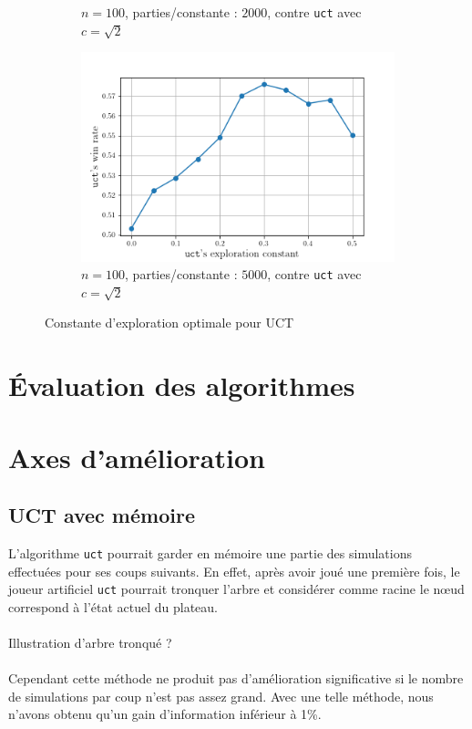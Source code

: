 \documentclass[a4paper]{article}
\theoremstyle{definition}
\begin{document}
\begin{figure}[!h]
\begin{subfigure}{0.32\textwidth}
		\caption{$n=100$, parties/constante : $2000$, contre \texttt{uct} avec $c = \sqrt{2}$}
		\label{fig:2_}
	\end{subfigure}
	\hfill
	\begin{subfigure}{0.32\textwidth}
		\centering
		\includegraphics[width=\textwidth]{test3.png}
		\caption{$n=100$, parties/constante : $5000$, contre \texttt{uct} avec $c = \sqrt{2}$}
		\label{fig:3_}
	\end{subfigure}
	\caption{Constante d'exploration optimale pour UCT}
	\label{fig:best-cst}
\end{figure}

\newpage

\section{Évaluation des algorithmes}


\newpage

\section{Axes d'amélioration}

\subsection{UCT avec mémoire}

L'algorithme \texttt{uct} pourrait garder en mémoire une partie des simulations effectuées pour ses coups suivants. En effet, après avoir joué une première fois, le joueur artificiel \texttt{uct} pourrait tronquer l'arbre et considérer comme racine le nœud correspond à l'état actuel du plateau.\\
\\
Illustration d'arbre tronqué ?\\
\\
Cependant cette méthode ne produit pas d'amélioration significative si le nombre de simulations par coup n'est pas assez grand. Avec une telle méthode, nous n'avons obtenu qu'un gain d'information inférieur à 1\%.
\end{document}
